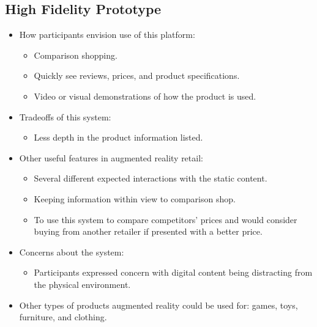 \subsection{High Fidelity Prototype}
\begin{itemize}
	\item How participants envision use of this platform:
	\begin{itemize} \compresslist%
		\item Comparison shopping.
		\item Quickly see reviews, prices, and product specifications.
		\item Video or visual demonstrations of how the product is used.
	\end{itemize}
	\item Tradeoffs of this system:
		\begin{itemize} \compresslist%
			\item Less depth in the product information listed.
		\end{itemize}
	\item Other useful features in augmented reality retail:
	\begin{itemize} \compresslist%
		\item Several different expected interactions with the static content.
		\item Keeping information within view to comparison shop.
		\item To use this system to compare competitors' prices and would consider buying from another retailer if presented with a better price.
	\end{itemize}
	\item Concerns about the system:
	\begin{itemize} \compresslist%
		\item Participants expressed concern with digital content being distracting from the physical environment.
	\end{itemize}
	\item Other types of products augmented reality could be used for: games, toys, furniture, and clothing.
\end{itemize}
